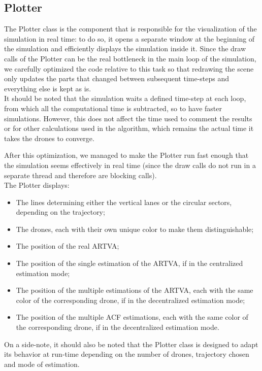 \subsection{Plotter}
The Plotter class is the component that is responsible for the visualization of the simulation in real time: to do so, it opens a separate window at the beginning of the simulation and efficiently displays the simulation inside it. Since the draw calls of the Plotter can be the real bottleneck in the main loop of the simulation, we carefully optimized the code relative to this task so that redrawing the scene only updates the parts that changed between subsequent time-steps and everything else is kept as is.\\
It should be noted that the simulation waits a defined time-step at each loop, from which all the computational time is subtracted, so to have faster simulations. However, this does not affect the time used to comment the results or for other calculations used in the algorithm, which remains the actual time it takes the drones to converge. 

After this optimization, we managed to make the Plotter run fast enough that the simulation seems effectively in real time (since the draw calls do not run in a separate thread and therefore are blocking calls).\\
The Plotter displays:

\begin{itemize}
    \item The lines determining either the vertical lanes or the circular sectors, depending on the trajectory; 
    \item The drones, each with their own unique color to make them distinguishable;
    \item The position of the real ARTVA; 
    \item The position of the single estimation of the ARTVA, if in the centralized estimation mode; 
    \item The position of the multiple estimations of the ARTVA, each with the same color of the corresponding drone, if in the decentralized estimation mode; 
    \item The position of the multiple ACF estimations, each with the same color of the corresponding drone, if in the decentralized estimation mode. 
\end{itemize}
On a side-note, it should also be noted that the Plotter class is designed to adapt its behavior at run-time depending on the number of drones, trajectory chosen and mode of estimation.

